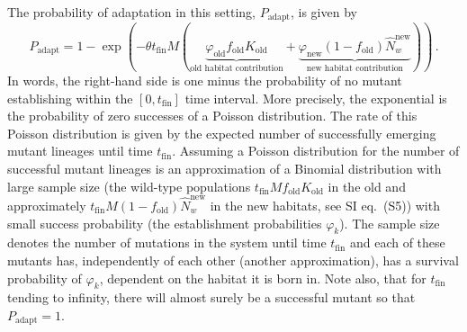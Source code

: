 \documentclass[a4paper,11pt]{article}
\newcommand{\pete}[1]{\textcolor{orange}{(#1)}}
\newcommand{\chg}[1]{\textcolor{change}{#1}}
\begin{document}
The probability of adaptation in this setting, $P_{\mathrm{adapt}}$, is given by
\begin{equation}\label{eq:source_sink}
	P_{\mathrm{adapt}} = 1 - \exp\left(-\theta t_{\text{fin}} M \left(\underbrace{\varphi_{\text{old}} f_{\text{old}} K_{\text{old}}}_{\text{old habitat contribution}} + \underbrace{\varphi_{\text{new}} (1-f_{\text{old}}) \widehat{N}_w^{\text{new}}}_{\text{new habitat contribution}}\right)\right)\, .	
\end{equation}
In words, the right-hand side is one minus the probability of no mutant establishing within the $[0, t_{\text{fin}}]$ time interval.
More precisely, the exponential is the probability of zero successes of a Poisson distribution. The rate of this Poisson distribution is given by the expected number of successfully emerging mutant lineages until time $t_{\text{fin}}$. \chg{Assuming a Poisson distribution for the number of successful mutant lineages is an approximation of a Binomial distribution with large sample size (the wild-type populations $t_{\text{fin}} M f_{\text{old}} K_{\text{old}}$ in the old and approximately $t_{\text{fin}} M (1-f_{\text{old}}) \widehat{N}_w^{\text{new}}$ in the new habitats, see SI eq.~(S5)) with small success probability (the establishment probabilities $\varphi_{k}$). The sample size denotes the number of mutations in the system until time $t_{\text{fin}}$ and each of these mutants has, independently of each other (another approximation), has a survival probability of $\varphi_{k}$, dependent on the habitat it is born in.}
Note also, that for $t_{\text{fin}}$ tending to infinity, there will almost surely be a successful mutant so that $P_{\text{adapt}}=1$. \\
\end{document}
